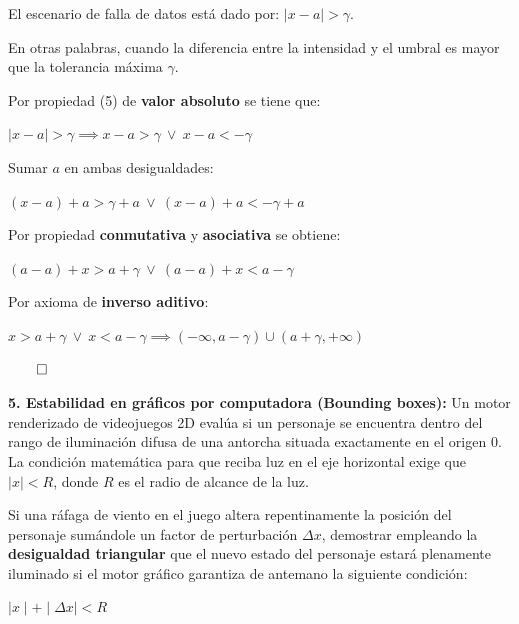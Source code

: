 \documentclass{article}
\begin{document}
El escenario de falla de datos está dado por: $\mid x - a \mid > \gamma$.

En otras palabras, cuando la diferencia entre la intensidad y el umbral es mayor que la tolerancia máxima $\gamma$.

Por propiedad (5) de \textbf{valor absoluto} se tiene que:

$\mid x - a \mid > \gamma \implies x - a > \gamma \ \lor \ x - a < -\gamma$

Sumar $a$ en ambas desigualdades:

$(x - a) + a > \gamma + a \ \lor \ (x - a) + a < - \gamma + a$

Por propiedad \textbf{conmutativa} y \textbf{asociativa} se obtiene:

$(a - a) + x > a + \gamma \ \lor \ (a - a) + x < a - \gamma$

Por axioma de \textbf{inverso aditivo}:

$x > a + \gamma \ \lor \ x < a - \gamma \implies (-\infty, a - \gamma) \cup (a + \gamma, +\infty)$

$\qed$

\textbf{5. Estabilidad en gráficos por computadora (Bounding boxes):} Un motor renderizado de videojuegos 2D evalúa si un personaje se encuentra dentro del rango de iluminación difusa de una antorcha situada exactamente en el origen 0. La condición matemática para que reciba luz en el eje horizontal exige que $\mid x \mid < R$, donde $R$ es el radio de alcance de la luz.

Si una ráfaga de viento en el juego altera repentinamente la posición del personaje sumándole un factor de perturbación $\Delta x$, demostrar empleando la \textbf{desigualdad triangular} que el nuevo estado del personaje estará plenamente iluminado si el motor gráfico garantiza de antemano la siguiente condición:

$\mid x \mid + \mid \Delta x \mid < R$
\end{document}
